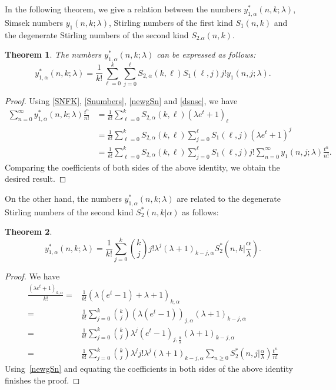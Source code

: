\documentclass{amsart}
\newtheorem{theorem}{Theorem}[section]
\numberwithin{equation}{section}
\theoremstyle{definition}
\theoremstyle{remark}
\begin{document}
In the following theorem, we give a relation between the numbers $y_{1, \alpha}^{*}(n, k; \lambda)$, Simsek numbers $y_{1}(n, k; \lambda)$, Stirling numbers of the first kind $S_{1}(n, k)$ and the degenerate Stirling numbers of the second kind $S_{2.\alpha}(n, k)$.
\begin{theorem}
The numbers $y_{1, \alpha}^{*}(n,k;\lambda)$ can be expressed as follows:
    $$y_{1,\alpha}^{*}(n,k;\lambda)=\frac{1}{k!}\sum_{\ell=0}^{k}\sum_{j=0}^{\ell}S_{2,\alpha}(k,\ell)S_{1}(\ell,j)j!y_{1}(n,j;\lambda).$$
\end{theorem}
\begin{proof}
Using \eqref{SNFK}, \eqref{Snumbers}, \eqref{newgSn} and \eqref{dsnsc}, we have
\begin{align}
    \sum_{n=0}^{\infty}y_{1, \alpha}^{*}(n,k;\lambda)\frac{t^n}{n!}&=\frac{1}{k!}\sum_{\ell=0}^{k}S_{2,\alpha}(k,\ell)(\lambda e^t+1)_\ell\\
    &=\frac{1}{k!}\sum_{\ell=0}^{k}S_{2,\alpha}(k,\ell)\sum_{j=0}^{\ell}S_{1}(\ell,j)(\lambda e^t+1)^j\\
    &=\frac{1}{k!}\sum_{\ell=0}^{k}S_{2,\alpha}(k,\ell)\sum_{j=0}^{\ell}S_{1}(\ell,j)j!\sum_{n=0}^{\infty}y_{1}(n,j;\lambda)\frac{t^n}{n!}.
\end{align}
Comparing the coefficients of both sides of the above identity, we obtain the desired result.
\end{proof} 
On the other hand, the numbers $y_{1,\alpha}^*(n,k;\lambda)$ are related to the degenerate Stirling numbers of the second kind $S_{2}^*(n,k| \alpha)$ as follows:
\begin{theorem}
\begin{equation}\label{ntsnntsn}
  y_{1,\alpha}^*(n,k;\lambda)=\frac{1}{k!}\sum_{j=0}^{k}\binom{k}{j}j!\lambda^j(\lambda+1)_{k-j,\alpha}S_{2}^*\left(n,k|\frac{\alpha}{\lambda}\right).
\end{equation}
\end{theorem}
\begin{proof} We have 
\begin{align*}
  \frac{\left(\lambda e^t+1\right)_{k,\alpha}}{k!} = & \frac{1}{k!}\left(\lambda(e^t-1)+\lambda+1\right)_{k,\alpha} \\
  = & \frac{1}{k!}\sum_{j=0}^{k}\binom{k}{j}\left(\lambda(e^t-1)\right)_{j,\alpha}(\lambda+1)_{k-j,\alpha}\\
  = &  \frac{1}{k!}\sum_{j=0}^{k}\binom{k}{j}\lambda^j (e^t-1)_{j,\frac{\alpha}{\lambda}}(\lambda+1)_{k-j,\alpha}\\
  = & \frac{1}{k!}\sum_{j=0}^{k}\binom{k}{j}\lambda^j j!\lambda^j (\lambda+1)_{k-j,\alpha}\sum_{n\geq 0} S_{2}^{*}\left(n,j|\frac{\alpha}{\lambda}\right)\frac{t^n}{n!}
\end{align*}
Using~\eqref{newgSn} and equating the coefficients in both sides of the above identity finishes the proof.
\end{proof}
\end{document}
